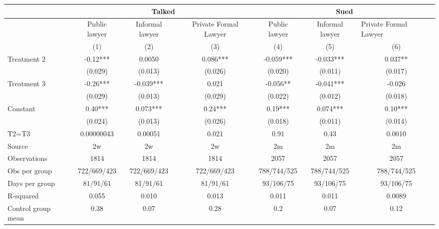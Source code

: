 \begin{tabular}{lcccccc}
\toprule
      & \multicolumn{3}{c}{Talked} & \multicolumn{3}{c}{Sued } \\
\midrule
      & Public lawyer & Informal lawyer & Private Formal Lawyer & Public lawyer & Informal lawyer & \multicolumn{1}{l}{Private Formal Lawyer} \\
\midrule
      & (1)   & (2)   & (3)   & (4)   & (5)   & (6) \\
Treatment 2 & -0.12*** & 0.0050 & 0.086*** & -0.059*** & -0.033*** & 0.037** \\
      & (0.029) & (0.013) & (0.026) & (0.020) & (0.011) & (0.017) \\
Treatment 3 & -0.26*** & -0.039*** & 0.021 & -0.056** & -0.041*** & -0.026 \\
      & (0.029) & (0.013) & (0.029) & (0.022) & (0.012) & (0.018) \\
Constant & 0.40*** & 0.073*** & 0.24*** & 0.19*** & 0.074*** & 0.10*** \\
      & (0.024) & (0.013) & (0.026) & (0.018) & (0.011) & (0.014) \\
T2=T3 & 0.00000043 & 0.00051 & 0.021 & 0.91  & 0.43  & 0.0010 \\
\midrule
Source & 2w    & 2w    & 2w    & 2m    & 2m    & 2m \\
Observations & 1814  & 1814  & 1814  & 2057  & 2057  & 2057 \\
Obs per group & 722/669/423 & 722/669/423 & 722/669/423 & 788/744/525 & 788/744/525 & 788/744/525 \\
Days per group & 81/91/61 & 81/91/61 & 81/91/61 & 93/106/75 & 93/106/75 & 93/106/75 \\
R-squared & 0.055 & 0.010 & 0.013 & 0.011 & 0.011 & 0.0089 \\
Control group mean & 0.38  & 0.07  & 0.28  & 0.2   & 0.07  & 0.12 \\
\bottomrule
\bottomrule
\end{tabular}%
